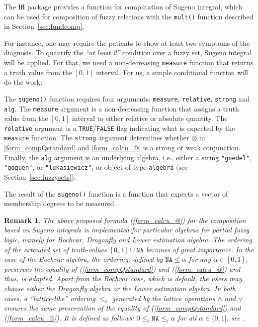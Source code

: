 \documentclass[review]{elsarticle}
\newcommand{\pkg}[1]{\textbf{#1}}
\newcommand{\code}[1]{\texttt{#1}}
\newtheorem{rem}{Remark}
\begin{document}
The \pkg{lfl} package provides a function for computation of Sugeno integral, which can be used for composition of fuzzy relations with the \code{mult()} function described in Section~\ref{sec:fundcomp}.

For instance, one may require the patients to show at least two symptoms of the diagnosis. To quantify the \emph{``at least 2''} condition over a fuzzy set, Sugeno integral will be applied. For that, we need a non-decreasing \code{measure} function that returns a truth value from the $[0,1]$ interval. For us, a simple conditional function will do the work:
%


The \code{sugeno()} function requires four arguments: \code{measure}, \code{relative}, \code{strong} and \code{alg}. The \code{measure} argument is a non-decreasing  function that assigns a truth value from the $[0, 1]$ interval to either relative or absolute quantity. The \code{relative} argument is a \code{TRUE}/\code{FALSE} flag indicating what is expected by the \code{measure} function. The \code{strong} argument determines whether $\otimes$ in \eqref{form_compQstandard} and \eqref{form_calcu_@} is a strong or weak conjunction. Finally, the \code{alg} argument is an underlying algebra, i.e., either a string \code{"goedel"}, \code{"goguen"}, or \code{"lukasiewicz"}, or object of type \code{algebra} (see Section~\ref{sec:fuzzysets}).

The result of the \code{sugeno()} function is a function that expects a vector of membership degrees to be measured.


\begin{rem}
The above proposed formula (\ref{form_calcu_@}) for  the composition based on Sugeno integrals is implemented for particular algebras for partial fuzzy logic, namely for Bochvar, Dragonfly and Lower estimation algebra. The ordering of the extended set of truth-values $[0,1]\cup \texttt{NA}$ becomes of great importance. In the case of the Bochvar algebra, the ordering, defined by $\texttt{NA} \le \alpha$ for any $\alpha \in [0,1]$, preserves the equality of (\ref{form_compQstandard}) and (\ref{form_calcu_@}) and thus, is adopted. Apart from the Bochvar case, which is default, the users may choose either the Dragonfly algebra or the Lower estimation algebra. In both cases, a 
 ``lattice-like'' ordering  $ \leq_{\ell} $ generated by the  lattice operations $\wedge$ and $\vee$ ensures the same preservation of the  equality of  (\ref{form_compQstandard}) and (\ref{form_calcu_@}). It is defined as follows: $0 \leq_{\ell} \texttt{NA} \leq_{\ell} \alpha$ for all $ \alpha\in (0, 1] $, see  \cite{Step_etal_Dragon_IJAR2019}. 
\end{rem}
\end{document}
